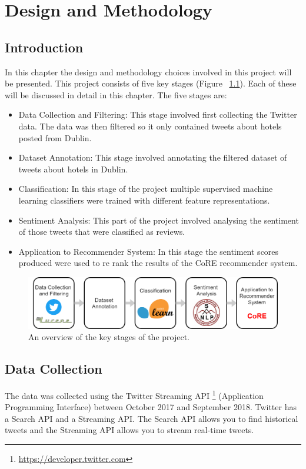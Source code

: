 \chapter{Design and Methodology}

\section{Introduction}

In this chapter the design and methodology choices involved in this project will be presented. This project consists of five key stages (Figure ~\ref{fig:pipeline}). Each of these will be discussed in detail in this chapter. The five stages are:
\begin{itemize}
    \item Data Collection and Filtering: This stage involved first collecting the Twitter data. The data was then filtered so it only contained tweets about hotels posted from Dublin.
    \item Dataset Annotation: This stage involved annotating the filtered dataset of tweets about hotels in Dublin.
    \item Classification: In this stage of the project multiple supervised machine learning classifiers were trained with different feature representations.
    \item Sentiment Analysis: This part of the project involved analysing the sentiment of those tweets that were classified as reviews.
    \item Application to Recommender System: In this stage the sentiment scores produced were used to re rank the results of the CoRE \cite{core2019} recommender system.
\end{itemize}

\begin{figure}[h!]
\centering
\includegraphics[width=1\textwidth]{design_and_methodology/pipeline.png}
\caption{\label{fig:pipeline} An overview of the key stages of the project.}
\end{figure}

\section{Data Collection}
The data was collected using the Twitter Streaming API \footnote{\url{https://developer.twitter.com}} (Application Programming Interface) between October 2017 and September 2018. Twitter has a Search API and a Streaming API. The Search API allows you to find historical tweets and the Streaming API allows you to stream real-time tweets.

